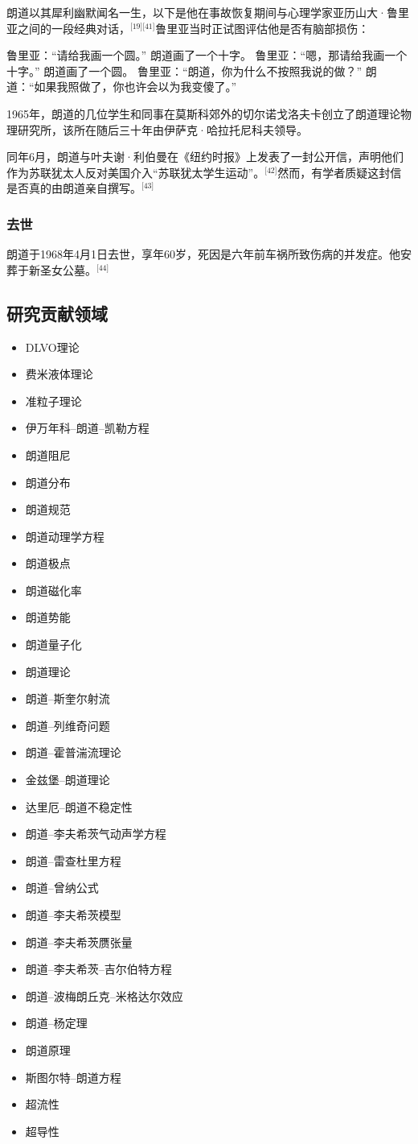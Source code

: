 朗道以其犀利幽默闻名一生，以下是他在事故恢复期间与心理学家亚历山大·鲁里亚之间的一段经典对话，\(^\text{[19][41]}\)鲁里亚当时正试图评估他是否有脑部损伤：

鲁里亚：“请给我画一个圆。”
朗道画了一个十字。
鲁里亚：“嗯，那请给我画一个十字。”
朗道画了一个圆。
鲁里亚：“朗道，你为什么不按照我说的做？”
朗道：“如果我照做了，你也许会以为我变傻了。”

1965年，朗道的几位学生和同事在莫斯科郊外的切尔诺戈洛夫卡创立了朗道理论物理研究所，该所在随后三十年由伊萨克·哈拉托尼科夫领导。

同年6月，朗道与叶夫谢·利伯曼在《纽约时报》上发表了一封公开信，声明他们作为苏联犹太人反对美国介入“苏联犹太学生运动”。\(^\text{[42]}\)然而，有学者质疑这封信是否真的由朗道亲自撰写。\(^\text{[43]}\)
\subsubsection{去世}
朗道于1968年4月1日去世，享年60岁，死因是六年前车祸所致伤病的并发症。他安葬于新圣女公墓。\(^\text{[44]}\)
\subsection{研究贡献领域}
\begin{itemize}
\item DLVO理论
\item 费米液体理论
\item 准粒子理论
\item 伊万年科–朗道–凯勒方程
\item 朗道阻尼
\item 朗道分布
\item 朗道规范
\item 朗道动理学方程
\item 朗道极点
\item 朗道磁化率
\item 朗道势能
\item 朗道量子化
\item 朗道理论
\item 朗道–斯奎尔射流
\item 朗道–列维奇问题
\item 朗道–霍普湍流理论
\item 金兹堡–朗道理论
\item 达里厄–朗道不稳定性
\item 朗道–李夫希茨气动声学方程
\item 朗道–雷查杜里方程
\item 朗道–曾纳公式
\item 朗道–李夫希茨模型
\item 朗道–李夫希茨赝张量
\item 朗道–李夫希茨–吉尔伯特方程
\item 朗道–波梅朗丘克–米格达尔效应
\item 朗道–杨定理
\item 朗道原理
\item 斯图尔特–朗道方程
\item 超流性
\item 超导性
\end{itemize}
